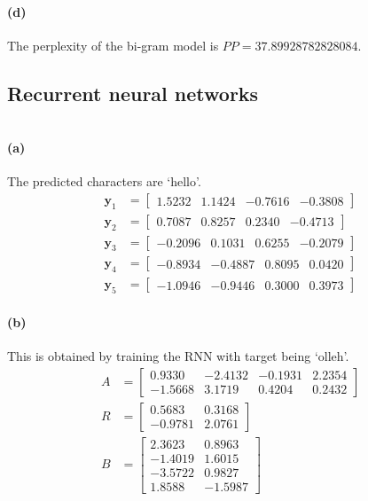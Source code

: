\documentclass[12pt]{article}
\begin{document}
\paragraph{(d)}
The perplexity of the bi-gram model is \(PP=37.89928782828084\).
\newpage

\subsection{Recurrent neural networks}
\inputminted[breaklines=true, linenos=true]{python}{./Homework3/ex2.py}
\paragraph{(a)}
The predicted characters are `hello'.
\begin{align*}
    \mathbf{y}_1&=\begin{bmatrix} 1.5232 &  1.1424 & -0.7616 & -0.3808\end{bmatrix}\\
    \mathbf{y}_2&=\begin{bmatrix} 0.7087 &  0.8257 &  0.2340 & -0.4713\end{bmatrix}\\
    \mathbf{y}_3&=\begin{bmatrix}-0.2096 &  0.1031 &  0.6255 & -0.2079\end{bmatrix}\\
    \mathbf{y}_4&=\begin{bmatrix}-0.8934 & -0.4887 &  0.8095 &  0.0420\end{bmatrix}\\
    \mathbf{y}_5&=\begin{bmatrix}-1.0946 & -0.9446 &  0.3000 &  0.3973\end{bmatrix}
\end{align*}
\paragraph{(b)}
This is obtained by training the RNN with target being `olleh'.
\begin{align*}
    A &= \begin{bmatrix}
         0.9330 & -2.4132 & -0.1931 &  2.2354 \\
        -1.5668 &  3.1719 &  0.4204 &  0.2432
    \end{bmatrix} \\
    R &= \begin{bmatrix}
         0.5683 &  0.3168 \\ -0.9781 &  2.0761
    \end{bmatrix} \\
    B &= \begin{bmatrix}
         2.3623 &  0.8963 \\ -1.4019 &  1.6015 \\
        -3.5722 &  0.9827 \\ 1.8588 & -1.5987
    \end{bmatrix}
\end{align*}
\newpage
\end{document}
